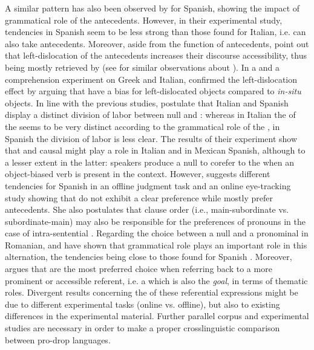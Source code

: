 \documentclass[output=paper,colorlinks,citecolor=brown]{langscibook}
\begin{document}
A similar pattern has also been observed by \citet{de2013effects} for Spanish, showing the impact of grammatical role of the antecedents. However, in their experimental study, tendencies in Spanish seem to be less strong than those found for Italian, i.e.  can also take  antecedents. Moreover, aside from the  function of antecedents, \citet{de2013effects} point out that left-dislocation of the antecedents increases their discourse accessibility, thus being mostly retrieved by  (see \citealt{runner2016information} for similar observations about ). In a  and a comprehension experiment on Greek and Italian, \citet{torregrossa2020variation} confirmed the left-dislocation effect by arguing that  have a bias for left-dislocated objects compared to \textit{in-situ} objects. In line with the previous studies, \citet{contemori2021microvariation} postulate that Italian and Spanish display a distinct division of labor between null and : whereas in Italian the  of the  seems to be very distinct according to the grammatical role of the , in Spanish the division of labor is less clear. The results of their  experiment show that  and causal  might play a role in Italian and in Mexican Spanish, although to a lesser extent in the latter: speakers produce a null  to corefer to the  when an object-biased verb is present in the context. However, \citet{chamorro2018offline} suggests different tendencies for Spanish in an offline judgment task and an online eye-tracking study showing that  do not exhibit a clear preference while  mostly prefer  antecedents. She also postulates that clause order (i.e., main-subordinate vs. subordinate-main) may also be responsible for the  preferences of pronouns in the case of intra-sentential .
Regarding the choice between a null and a pronominal  in Romanian, \citet{lindemann2020thematic} and \citet{istrate2022position} have shown that grammatical role plays an important role in this alternation, the tendencies being close to those found for Spanish \citep{de2013effects}. Moreover, \citet{lindemann2020thematic} argues that  are the most preferred choice when referring back to a more prominent or accessible referent, i.e. a   which is also the \textit{goal}, in terms of thematic roles. Divergent results concerning the  of these referential expressions might be due to different experimental tasks (online vs. offline), but also to existing differences in the experimental material. Further parallel corpus and experimental studies are necessary in order to make a proper crosslinguistic comparison between pro-drop languages.
\end{document}
